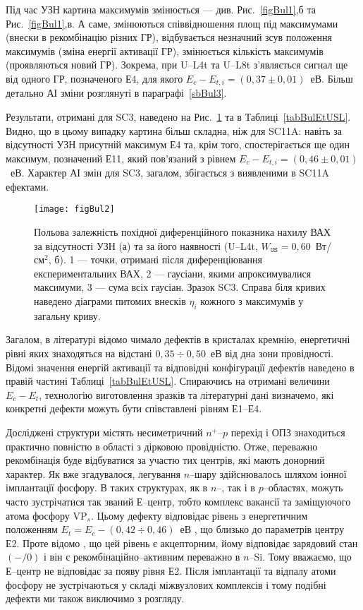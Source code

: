 Під час УЗН картина максимумів змінюється --- див. Рис.~\ref{figBul1},б та Рис.~\ref{figBul1},в.
А саме, змінюються співвідношення площ під максимумами (внески в рекомбінацію різних ГР),
відбувається незначний зсув положення максимумів (зміна енергії активації ГР),
змінюється кількість максимумів (проявляються новий ГР).
Зокрема, при U--L4t та U--L8t з'являється сигнал ще від одного ГР,
позначеного Е4, для якого $E_c-E_{t,i}=(0,37\pm0,01)$~еВ.
Більш детально АІ зміни розглянуті в параграфі~\ref{sbBul3}.


Результати, отримані для SC3, наведено на Рис.~\ref{figBul2} та в Таблиці~\ref{tabBulEtUSL}.
Видно, що в цьому випадку картина більш складна, ніж для SC11A:
навіть за відсутності УЗН присутній максимум Е4 та, крім того,
спостерігається ще один максимум, позначений Е11, який пов'язаний з рівнем $E_c-E_{t,i}=(0,46\pm0,01)$~еВ.
Характер АІ змін для SC3, загалом, збігається з виявленими в SC11A ефектами.




\begin{figure}
\center
\texttt{[image: figBul2]}
\caption{\label{figBul2}
Польова залежність похідної диференційного показника нахилу ВАХ за відсутності УЗН (а)
та за його наявності (U--L4t,  $W_\mathtt{US}=0,60$~Вт/см$^2$, б).
1 --- точки, отримані після диференціювання експериментальних ВАХ,
2 --- гаусіани, якими апроксимувалися максимуми,
3 --- сума всіх гаусіан.
Зразок SC3.
Справа біля кривих наведено діаграми питомих внесків $\eta_i$ кожного з максимумів у загальну криву.
}%
\end{figure}

Загалом, в літературі відомо чимало дефектів в кристалах кремнію, енергетичні рівні яких знаходяться на відстані
$0,35\div0,50$~еВ від дна зони провідності.
Відомі значення енергій активації та відповідні конфігурації дефектів наведено в правій частині Таблиці~\ref{tabBulEtUSL}.
Спираючись на отримані величини $E_c-E_t$, технологію виготовлення зразків та літературні дані
визначемо, які конкретні дефекти можуть бути співставлені рівням Е1--Е4.

Досліджені структури містять несиметричний $n^+$--$p$ перехід і ОПЗ знаходиться практично повністю в області з дірковою провідністю.
Отже, переважно рекомбінація буде відбуватися за участю тих центрів, які мають донорний характер.
Як вже згадувалося, легування $n$--шару здійснювалось шляхом іонної імплантації фосфору.
В таких структурах, як в $n$--, так і в $p$--областях, можуть часто зустрічатися так званий Е--центр,
тобто комплекс вакансії та заміщуючого атома фосфору VP$_s$.
Цьому дефекту відповідає  рівень з енергетичним положенням $E_t=E_c-(0,42\div0,46)$~еВ \cite{VI:Luc,Karazh,Kuchinskii,Ecentre:2005}, що близько до параметрів центру Е2.
Проте відомо \cite{Kuchinskii,Ecentre:2005}, що цей рівень є акцепторним, йому відповідає зарядовий стан  $(-/0)$ і він є рекомбінаційно--активним переважно в $n$--Si.
Тому вважаємо, що Е--центр не відповідає за появу рівня Е2.
Після імплантації та відпалу атоми фосфору не зустрічаються у складі міжвузлових комплексів \cite{ChelyadFTT} і тому подібні дефекти ми також виключимо з розгляду.

